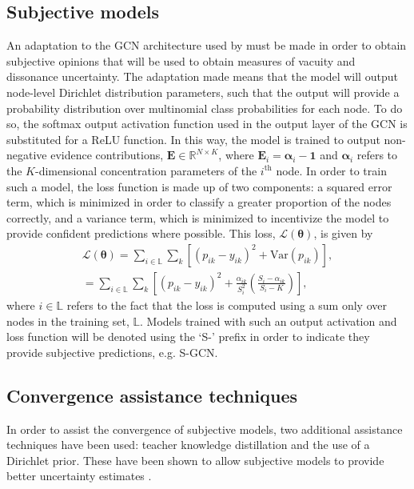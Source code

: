 \documentclass[
twocolumn,
]{ceurart}
\begin{document}
\subsection{Subjective models}
An adaptation to the GCN architecture used by \cite{Kipf2017} must be made in order to obtain subjective opinions that will be used to obtain measures of vacuity and dissonance uncertainty.
The adaptation made means that the model will output node-level Dirichlet distribution parameters, such that the output will provide a probability distribution over multinomial class probabilities for each node.
To do so, the softmax output activation function used in the output layer of the GCN is substituted for a ReLU function.
In this way, the model is trained to output non-negative evidence contributions, $\mathbf{E}\in\mathbb{R}^{N\times K}$, where $\mathbf{E}_{i} = \boldsymbol{\alpha}_{i}-\mathbf{1}$ and $\boldsymbol{\alpha}_{i}$ refers to the $K$-dimensional concentration parameters of the $i^\text{th}$ node.
In order to train such a model, the loss function is made up of two components: a squared error term, which is minimized in order to classify a greater proportion of the nodes correctly, and a variance term, which is minimized to incentivize the model to provide confident predictions where possible.
This loss, $\mathcal{L}(\boldsymbol{\theta})$, is given by
\begin{equation}
\begin{split}
    \mathcal{L}(\boldsymbol{\theta})=\sum_{i\in\mathbb{L}}\sum_k \left[(p_{ik}-y_{ik})^2+\text{Var}(p_{ik})\right],\\
    =\sum_{i\in\mathbb{L}}\sum_k \left[(p_{ik}-y_{ik})^2+\frac{\alpha_{ik}}{S_i^2}\left(\frac{S_i-\alpha_{ik}}{S_i-K}\right)\right],
\end{split}
\label{eq:core_loss}
\end{equation}
where $i\in\mathbb{L}$ refers to the fact that the loss is computed using a sum only over nodes in the training set, $\mathbb{L}$.
Models trained with such an output activation and loss function will be denoted using the `S-' prefix in order to indicate they provide subjective predictions, e.g. S-GCN.

\subsection{Convergence assistance techniques}
In order to assist the convergence of subjective models, two additional assistance techniques have been used: teacher knowledge distillation and the use of a Dirichlet prior.
These have been shown to allow subjective models to provide better uncertainty estimates \cite{ZhaoXujiang2020}.
\end{document}
